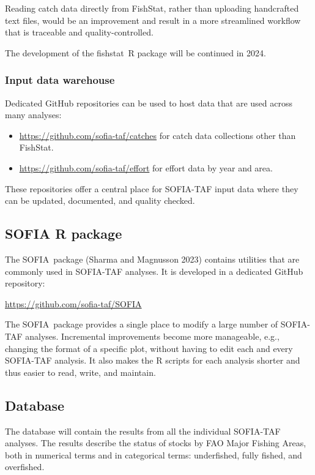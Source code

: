 \documentclass[12pt]{article}
\newcommand\blue[1]{\textcolor{darkblue}{#1}}
\newcommand\fishstat{{\sf fishstat}}
\newcommand\SOFIA{{\sf SOFIA}}
\begin{document}
Reading catch data directly from FishStat, rather than uploading handcrafted
text files, would be an improvement and result in a more streamlined workflow
that is traceable and quality-controlled.

The development of the \fishstat\ R package will be continued in 2024.

\subsubsection{Input data warehouse}
\label{subsubsec:design-data-warehouse}

Dedicated GitHub repositories can be used to host data that are used across many
analyses:

\begin{itemize}
  \item \blue{\url{https://github.com/sofia-taf/catches}} for catch data
  collections other than FishStat.
  \item \blue{\url{https://github.com/sofia-taf/effort}} for effort data by year
  and area.
\end{itemize}

These repositories offer a central place for SOFIA-TAF input data where they can
be updated, documented, and quality checked.

\newpage

\subsection{SOFIA R package}

The \SOFIA\ package (Sharma and Magnusson 2023) contains utilities that are
commonly used in SOFIA-TAF analyses. It is developed in a dedicated GitHub
repository:

\qquad\blue{\url{https://github.com/sofia-taf/SOFIA}}

The \SOFIA\ package provides a single place to modify a large number of
SOFIA-TAF analyses. Incremental improvements become more manageable, e.g.,
changing the format of a specific plot, without having to edit each and every
SOFIA-TAF analysis. It also makes the R scripts for each analysis shorter and
thus easier to read, write, and maintain.

\subsection{Database}

The database will contain the results from all the individual SOFIA-TAF
analyses. The results describe the status of stocks by FAO Major Fishing Areas,
both in numerical terms and in categorical terms: underfished, fully fished, and
overfished.
\end{document}

